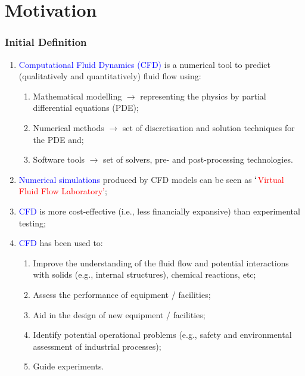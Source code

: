 \documentclass[10pt,compress, unknownkeysallowed]{beamer}
\newcommand{\red}{\textcolor{red}}
\begin{document}
\section{Motivation}
\begin{frame}
 \frametitle{Initial Definition}

\begin{enumerate}
\item <1->\textcolor{blue}{Computational Fluid Dynamics (CFD)} is a numerical tool to predict (qualitatively and quantitatively) fluid flow using:
\begin{enumerate}
\item <2-> Mathematical modelling $\rightarrow$ representing the physics by partial differential equations (PDE);
\item <3-> Numerical methods $\rightarrow$ set of discretisation and solution techniques for the PDE and;
\item <4-> Software tools $\rightarrow$ set of solvers, pre- and post-processing technologies.
\end{enumerate}
\item <5-> \textcolor{blue}{Numerical simulations} produced by CFD models can be seen as \red{$\lq$Virtual Fluid Flow Laboratory'};
\item <6-> \textcolor{blue}{CFD} is more cost-effective (i.e., less financially expansive) than experimental testing;
\item <7-> \textcolor{blue}{CFD} has been used to:
\begin{enumerate}
\item <8-> Improve the understanding of the fluid flow and potential interactions with solids (e.g., internal structures), chemical reactions, etc;
\item <9-> Assess the performance of equipment / facilities;
\item <10-> Aid in the design of new equipment / facilities;
\item <11-> Identify potential operational problems (e.g., safety and environmental assessment of industrial processes);
\item <12-> Guide experiments.
\end{enumerate}

\end{enumerate}
 
\end{frame}
\end{document}
